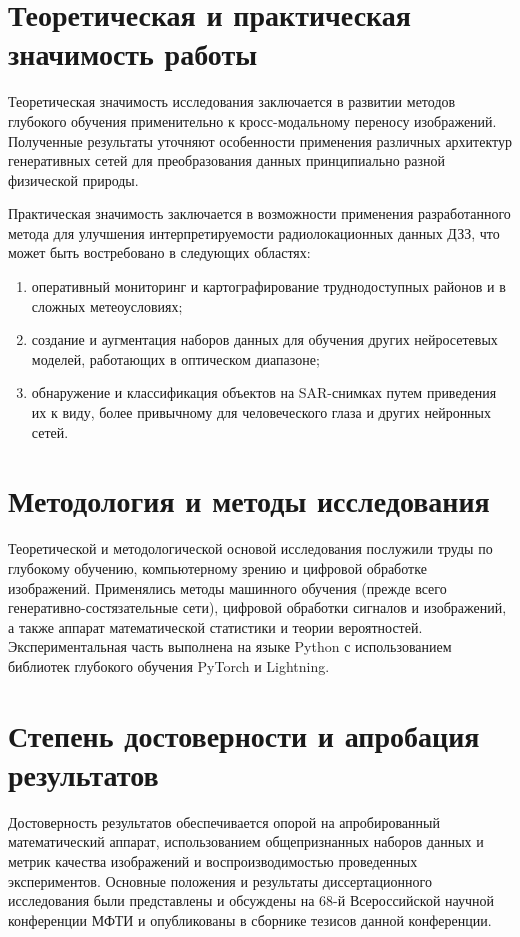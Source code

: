 \section{Теоретическая и практическая значимость работы}
Теоретическая значимость исследования заключается в развитии методов глубокого обучения применительно к кросс-модальному переносу изображений.
Полученные результаты уточняют особенности применения различных архитектур генеративных сетей для преобразования данных принципиально разной физической природы.

Практическая значимость заключается в возможности применения разработанного метода для улучшения интерпретируемости радиолокационных данных ДЗЗ, что может быть востребовано в следующих областях:
\begin{enumerate}[label*=\arabic*.]
    \item оперативный мониторинг и картографирование труднодоступных районов и в сложных метеоусловиях;
    \item создание и аугментация наборов данных для обучения других нейросетевых моделей, работающих в оптическом диапазоне;
    \item обнаружение и классификация объектов на SAR-снимках путем приведения их к виду, более привычному для человеческого глаза и других нейронных сетей.
\end{enumerate}

\section{Методология и методы исследования}

Теоретической и методологической основой исследования послужили труды по глубокому обучению, компьютерному зрению и цифровой обработке изображений.
Применялись методы машинного обучения (прежде всего генеративно-состязательные сети), цифровой обработки сигналов и изображений, а также аппарат математической статистики и теории вероятностей.
Экспериментальная часть выполнена на языке Python с использованием библиотек глубокого обучения PyTorch и Lightning.

\section{Степень достоверности и апробация результатов}
Достоверность результатов обеспечивается опорой на апробированный математический аппарат, использованием общепризнанных наборов данных и метрик качества изображений и воспроизводимостью проведенных экспериментов.
Основные положения и результаты диссертационного исследования были представлены и обсуждены на 68-й Всероссийской научной конференции МФТИ и опубликованы в сборнике тезисов данной конференции.
\newpage